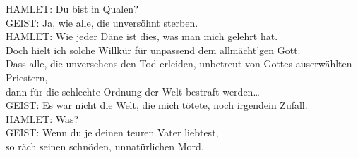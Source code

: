 \begin{playdialog}
HAMLET: Du bist in Qualen?\\

GEIST: Ja, wie alle, die unversöhnt sterben.\\

HAMLET: Wie jeder Däne ist dies, was man mich gelehrt hat.\\
Doch hielt ich solche Willkür für unpassend dem allmächt'gen Gott.\\
Dass alle, die unversehens den Tod erleiden, unbetreut von Gottes auserwählten Priestern,\\
dann für die schlechte Ordnung der Welt bestraft werden…\\

GEIST: Es war nicht die Welt, die mich tötete, noch irgendein Zufall.\\

HAMLET: Was?\\

GEIST: Wenn du je deinen teuren Vater liebtest,\\
so räch seinen schnöden, unnatürlichen Mord.\\


\end{playdialog}
